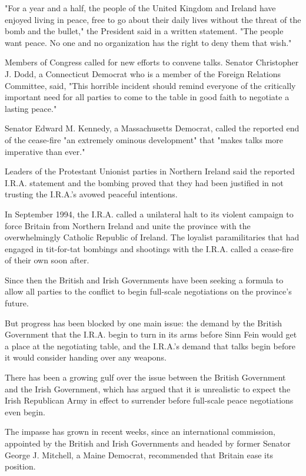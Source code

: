 "For a year and a half, the people of the United Kingdom and Ireland
have enjoyed living in peace, free to go about their daily lives without
the threat of the bomb and the bullet," the President said in a written
statement. "The people want peace. No one and no organization has the
right to deny them that wish."

Members of Congress called for new efforts to convene talks. Senator
Christopher J. Dodd, a Connecticut Democrat who is a member of the
Foreign Relations Committee, said, "This horrible incident should remind
everyone of the critically important need for all parties to come to the
table in good faith to negotiate a lasting peace."

Senator Edward M. Kennedy, a Massachusetts Democrat, called the reported
end of the cease-fire "an extremely ominous development" that "makes
talks more imperative than ever."

Leaders of the Protestant Unionist parties in Northern Ireland said the
reported I.R.A. statement and the bombing proved that they had been
justified in not trusting the I.R.A.'s avowed peaceful intentions.

In September 1994, the I.R.A. called a unilateral halt to its violent
campaign to force Britain from Northern Ireland and unite the province
with the overwhelmingly Catholic Republic of Ireland. The loyalist
paramilitaries that had engaged in tit-for-tat bombings and shootings
with the I.R.A. called a cease-fire of their own soon after.

Since then the British and Irish Governments have been seeking a formula
to allow all parties to the conflict to begin full-scale negotiations on
the province's future.

But progress has been blocked by one main issue: the demand by the
British Government that the I.R.A. begin to turn in its arms before Sinn
Fein would get a place at the negotiating table, and the I.R.A.'s demand
that talks begin before it would consider handing over any weapons.

There has been a growing gulf over the issue between the British
Government and the Irish Government, which has argued that it is
unrealistic to expect the Irish Republican Army in effect to surrender
before full-scale peace negotiations even begin.

The impasse has grown in recent weeks, since an international
commission, appointed by the British and Irish Governments and headed by
former Senator George J. Mitchell, a Maine Democrat, recommended that
Britain ease its position.

